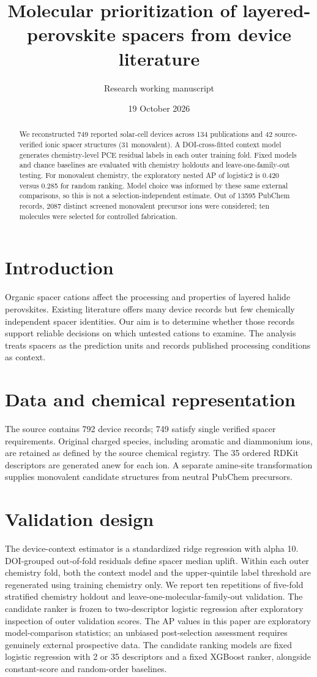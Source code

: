 \documentclass[11pt,a4paper]{article}
\title{Molecular prioritization of layered-perovskite spacers from device literature}
\author{Research working manuscript}
\date{19 October 2026}
\begin{document}
\maketitle
\begin{abstract}
We reconstructed 749 reported solar-cell devices across 134 publications and 42 source-verified ionic spacer structures (31 monovalent).
A DOI-cross-fitted context model generates chemistry-level PCE residual labels in each outer training fold. 
Fixed models and chance baselines are evaluated with chemistry holdouts and leave-one-family-out testing.
For monovalent chemistry, the exploratory nested AP of logistic2 is 0.420 versus 0.285 for random ranking. Model choice was informed by these same external comparisons, so this is not a selection-independent estimate.
Out of 13595 PubChem records, 2087 distinct screened monovalent precursor ions were considered; ten molecules were selected for controlled fabrication.
\end{abstract}
\section{Introduction}
Organic spacer cations affect the processing and properties of layered halide perovskites. 
Existing literature offers many device records but few chemically independent spacer identities. 
Our aim is to determine whether those records support reliable decisions on which untested cations to examine. 
The analysis treats spacers as the prediction units and records published processing conditions as context.
\section{Data and chemical representation}
The source contains 792 device records; 749 satisfy single verified spacer requirements.
Original charged species, including aromatic and diammonium ions, are retained as defined by the source chemical registry.
The 35 ordered RDKit descriptors are generated anew for each ion. 
A separate amine-site transformation supplies monovalent candidate structures from neutral PubChem precursors.
\section{Validation design}
The device-context estimator is a standardized ridge regression with alpha 10. DOI-grouped out-of-fold residuals define spacer median uplift.
Within each outer chemistry fold, both the context model and the upper-quintile label threshold are regenerated using training chemistry only.
We report ten repetitions of five-fold stratified chemistry holdout and leave-one-molecular-family-out validation.
The candidate ranker is frozen to two-descriptor logistic regression after exploratory inspection of outer validation scores. The AP values in this paper are exploratory model-comparison statistics; an unbiased post-selection assessment requires genuinely external prospective data.
The candidate ranking models are fixed logistic regression with 2 or 35 descriptors and a fixed XGBoost ranker, alongside constant-score and random-order baselines.
\end{document}
